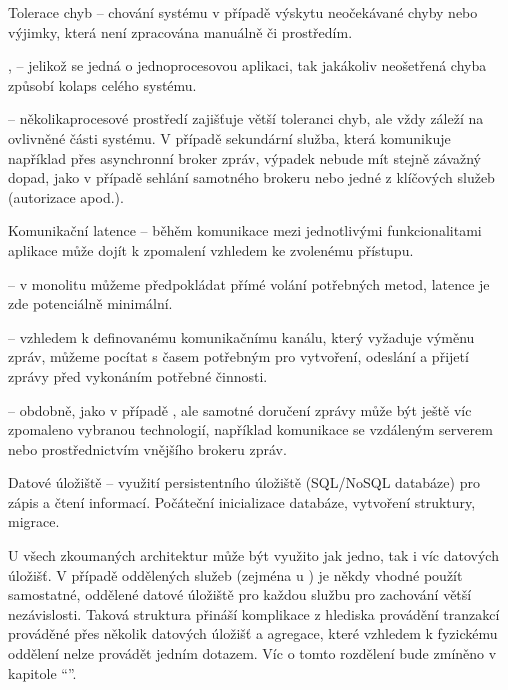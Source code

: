 \begin{dl}
   \item[Tolerace chyb] – chování systému v případě výskytu neočekávané chyby nebo výjimky, která není zpracována manuálně či  prostředím.
\end{dl}
\begin{ul}
   \item {},  – jelikož se jedná o jednoprocesovou aplikaci, tak jakákoliv neošetřená chyba způsobí kolaps celého systému.
   \item {} – několikaprocesové prostředí zajišťuje větší toleranci chyb, ale vždy záleží na ovlivněné části systému.
   V případě sekundární služba, která komunikuje například přes asynchronní broker zpráv, výpadek nebude mít stejně závažný dopad, jako v případě sehlání samotného brokeru nebo jedné z klíčových služeb (autorizace apod.).
\end{ul}

\begin{dl}
   \item[Komunikační latence] – běhěm komunikace mezi jednotlivými funkcionalitami aplikace může dojít k zpomalení vzhledem ke zvolenému přístupu.
\end{dl}
\begin{ul}
   \item {} – v monolitu můžeme předpokládat přímé volání potřebných metod, latence je zde potenciálně minimální.
   \item {} – vzhledem k definovanému komunikačnímu kanálu, který vyžaduje výměnu zpráv, můžeme pocítat s časem potřebným pro vytvoření, odeslání a přijetí zprávy před vykonáním potřebné činnosti.
   \item {} – obdobně, jako v případě , ale samotné doručení zprávy může být ještě víc zpomaleno vybranou technologií, například komunikace se vzdáleným serverem nebo prostřednictvím vnějšího brokeru zpráv.
\end{ul}

\begin{dl}
   \item[Datové úložiště] – využití persistentního úložiště (SQL/NoSQL databáze) pro zápis a čtení informací.
   Počáteční inicializace databáze, vytvoření struktury, migrace.

   U všech zkoumaných architektur může být využito jak jedno, tak i víc datových úložišť.
   V případě oddělených služeb (zejména u ) je někdy vhodné použít samostatné, oddělené datové úložiště pro každou službu pro zachování větší nezávislosti.
   Taková struktura přináší komplikace z hlediska provádění tranzakcí prováděné přes několik datových úložišť a agregace, které vzhledem k fyzickému oddělení nelze provádět jedním  dotazem.
   Víc o tomto rozdělení bude zmíněno v kapitole \enquote{}.
\end{dl}

